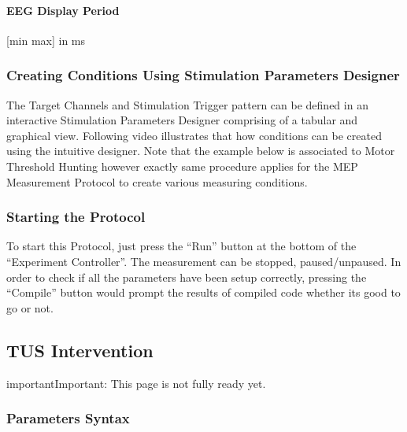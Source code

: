 \documentclass[letterpaper,10pt,english]{sphinxmanual}
\begin{document}
\paragraph{EEG Display Period}
\label{\detokenize{12_rTMSIntervention:eeg-display-period}}
\sphinxAtStartPar
{[}min max{]} in ms


\subsubsection{Creating Conditions Using Stimulation Parameters Designer}
\label{\detokenize{12_rTMSIntervention:creating-conditions-using-stimulation-parameters-designer}}
\sphinxAtStartPar
The Target Channels and Stimulation Trigger pattern can be defined in an interactive Stimulation Parameters Designer comprising of a tabular and graphical view. Following video illustrates that how conditions can be created using the intuitive designer. Note that the example below is associated to Motor Threshold Hunting however exactly same procedure applies for the MEP Measurement Protocol to create various measuring conditions.


\subsubsection{Starting the Protocol}
\label{\detokenize{12_rTMSIntervention:starting-the-protocol}}
\sphinxAtStartPar
To start this Protocol, just press the “Run” button at the bottom of the “Experiment Controller”. The measurement can be stopped, paused/unpaused. In order to check if all the parameters have been setup correctly, pressing the “Compile” button would prompt the results of compiled code whether its good to go or not.


\subsection{TUS Intervention}
\label{\detokenize{13_TUSIntervention:tus-intervention}}\label{\detokenize{13_TUSIntervention::doc}}
\begin{sphinxadmonition}{important}{Important:}
\sphinxAtStartPar
This page is not fully ready yet.
\end{sphinxadmonition}


\subsubsection{Parameters Syntax}
\label{\detokenize{13_TUSIntervention:parameters-syntax}}
\end{document}
